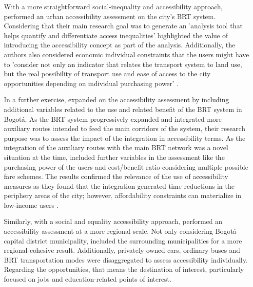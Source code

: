 \documentclass[12pt, a4paper]{report}
\begin{document}
With a more straightforward social-inequality and accessibility approach, \cite{bocarejos.TransportAccessibilitySocial2012} performed an urban accessibility assessment on the city's BRT system. Considering that their main research goal was to generate an 'analysis tool that helps quantify and differentiate access inequalities' \cite{bocarejos.TransportAccessibilitySocial2012} highlighted the value of introducing the accessibility concept as part of the analysis. Additionally, the authors also considered economic individual constraints that the users might have to 'consider not only an indicator that relates the transport system to land use, but the real possibility of transport use and ease of access to the city opportunities depending on individual purchasing power' \cite{bocarejos.TransportAccessibilitySocial2012}.

In a further exercise, \cite{bocarejoAccessibilityAnalysisIntegrated2014} expanded on the accessibility assessment by including additional variables related to the use and related benefit of the BRT system in Bogotá. As the BRT system progressively expanded and integrated more auxiliary routes intended to feed the main corridors of the system, their research purpose was to assess the impact of the integration in accessibility terms. As the integration of the auxiliary routes with the main BRT network was a novel situation at the time, \cite{bocarejoAccessibilityAnalysisIntegrated2014} included further variables in the assessment like the purchasing power of the users and cost/benefit ratio considering multiple possible fare schemes. The results confirmed the relevance of the use of accessibility measures as they found that the integration generated time reductions in the periphery areas of the city; however, affordability constraints can materialize in low-income users \citep{bocarejoAccessibilityAnalysisIntegrated2014}.

Similarly, with a social and equality accessibility approach, \cite{guzmanAssessingEquityTransport2017} performed an accessibility assessment at a more regional scale. Not only considering Bogotá capital district municipality, \cite{guzmanAssessingEquityTransport2017} included the surrounding municipalities for a more regional-cohesive result. Additionally, privately owned cars, ordinary buses and BRT transportation modes were disaggregated to assess accessibility individually. Regarding the opportunities, that means the destination of interest,\cite{guzmanAssessingEquityTransport2017} particularly focused on jobs and education-related points of interest.
\end{document}
